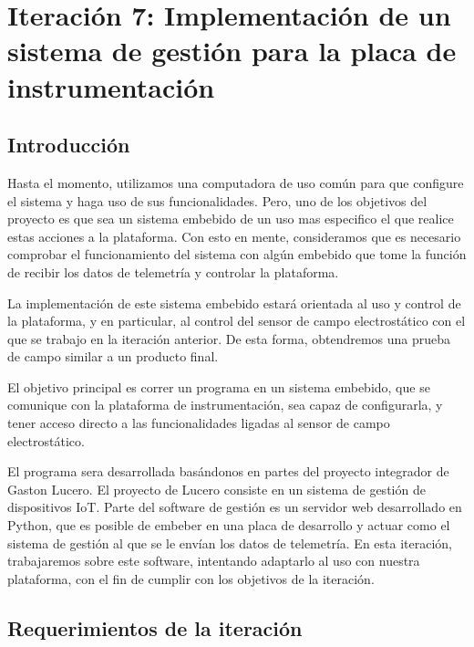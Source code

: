 \chapter{Iteración 7: Implementación de un sistema de gestión para la placa de instrumentación} %
\label{cha:iteracion_7}

\section{Introducción} %
\label{it7:sec:introduccion}

Hasta el momento, utilizamos una computadora de uso común para que configure el sistema y haga uso de sus funcionalidades. Pero, uno de los objetivos del proyecto es que sea un sistema embebido de un uso mas especifico el que realice estas acciones a la plataforma. Con esto en mente, consideramos que es necesario comprobar el funcionamiento del sistema con algún embebido que tome la función de recibir los datos de telemetría y controlar la plataforma.

La implementación de este sistema embebido estará orientada al uso y control de la plataforma, y en particular, al control del sensor de campo electrostático con el que se trabajo en la iteración anterior. De esta forma, obtendremos una prueba de campo similar a un producto final.

El objetivo principal es correr un programa en un sistema embebido, que se comunique con la plataforma de instrumentación, sea capaz de configurarla, y tener acceso directo a las funcionalidades ligadas al sensor de campo electrostático.

El programa sera desarrollada basándonos en partes del proyecto integrador de Gaston Lucero. El proyecto de Lucero consiste en un sistema de gestión de dispositivos IoT. Parte del software de gestión es un servidor web desarrollado en Python, que es posible de embeber en una placa de desarrollo y actuar como el sistema de gestión al que se le envían los datos de telemetría. En esta iteración, trabajaremos sobre este software, intentando adaptarlo al uso con nuestra plataforma, con el fin de cumplir con los objetivos de la iteración.


\section{Requerimientos de la iteración} %
\label{it7:sec:requerimientos_de_la_iteracion}

